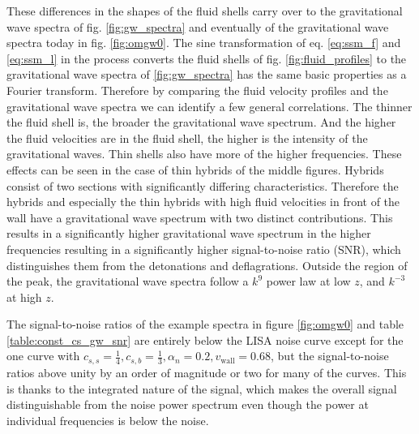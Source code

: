 These differences in the shapes of the fluid shells carry over to the gravitational wave spectra of fig. \ref{fig:gw_spectra} and eventually of the gravitational wave spectra today in fig. \ref{fig:omgw0}.
The sine transformation of eq. \eqref{eq:ssm_f} and \eqref{eq:ssm_l} in the process converts the fluid shells of fig. \ref{fig:fluid_profiles} to the gravitational wave spectra of \ref{fig:gw_spectra} has the same basic properties as a Fourier transform.
Therefore by comparing the fluid velocity profiles and the gravitational wave spectra we can identify a few general correlations.
The thinner the fluid shell is, the broader the gravitational wave spectrum.
And the higher the fluid velocities are in the fluid shell, the higher is the intensity of the gravitational waves.
Thin shells also have more of the higher frequencies.
These effects can be seen in the case of thin hybrids of the middle figures.
Hybrids consist of two sections with significantly differing characteristics.
Therefore the hybrids and especially the thin hybrids with high fluid velocities in front of the wall have a gravitational wave spectrum with two distinct contributions.
This results in a significantly higher gravitational wave spectrum in the higher frequencies resulting in a significantly higher signal-to-noise ratio (SNR),
which distinguishes them from the detonations and deflagrations.
Outside the region of the peak, the gravitational wave spectra follow a $k^9$ power law at low $z$,
and $k^{-3}$ at high $z$.

The signal-to-noise ratios of the example spectra in figure \ref{fig:omgw0} and table \ref{table:const_cs_gw_snr}
are entirely below the LISA noise curve except for the one curve with
$c_{s,s} = \frac{1}{4}, c_{s,b} = \frac{1}{3}, \alpha_n = 0.2, v_\text{wall} = 0.68$,
but the signal-to-noise ratios above unity by an order of magnitude or two for many of the curves.
This is thanks to the integrated nature of the signal,
which makes the overall signal distinguishable from the noise power spectrum even though the power at individual frequencies is below the noise.
\cite{thrane_sensitivity_2013}


